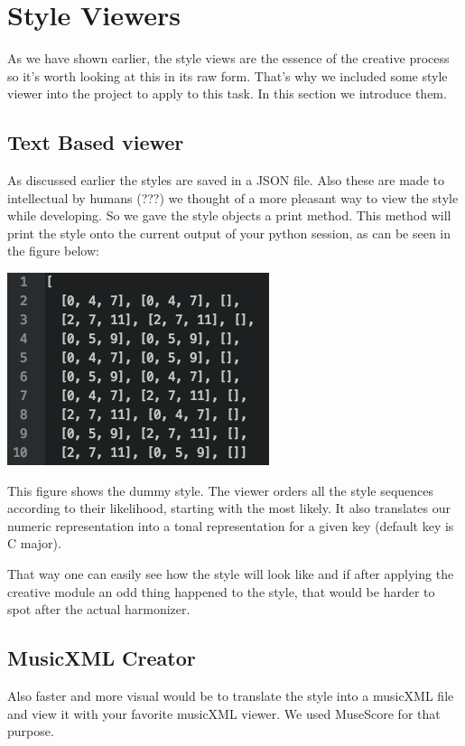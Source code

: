 \section{Style Viewers} 
As we have shown earlier, the style views are the essence of the creative process so it's worth looking at this in its raw form. That's why we included some style viewer into the project to apply to this task. In this section we introduce them.

\subsection{Text Based viewer}
As discussed earlier the styles are saved in a JSON file. Also these are made to intellectual by humans (???) we thought of a more pleasant way to view the style while developing. So we gave the style objects a print method. This method will print the style onto the current output of your python session, as can be seen in the figure below:

\includegraphics[scale=1]{Chapters/pic/text_print.png}

This figure shows the dummy style. The viewer orders all the style sequences according to their likelihood, starting with the most likely.  It also translates our numeric representation into a tonal representation for a given key (default key is C major).

That way one can easily see how the style will look like and if after applying the creative module an odd thing happened to the style, that would be harder to spot after the actual harmonizer. 

\subsection{MusicXML Creator}
Also faster and more visual would be to translate the style into a musicXML file and view it with your favorite musicXML viewer. We used MuseScore for that purpose. 

